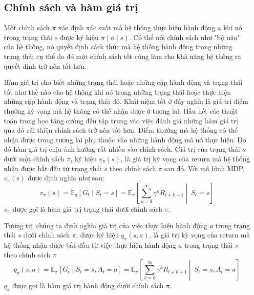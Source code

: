 	
	\subsection{Chính sách và hàm giá trị}
	Một chính sách $\pi$ xác định xác suất mà hệ thông thực hiện hành động $a$ khi nó trong trạng thái $s$ được ký hiệu $\pi(a \mid s)$. Có thể nói chính sách như "bộ não" của hệ thống, nó quyết định cách thức mà hệ thống hành động trong những trạng thái cụ thể do đó một chính sách tốt cũng làm cho khả năng hệ thống ra quyết định trở nên tốt hơn.
		
	Hàm giá trị cho biết những trạng thái hoặc những cặp hành động và trạng thái tốt như thế nào cho hệ thông khi nó trong những trạng thái hoặc thực hiện những cặp hành động và trạng thái đó. Khái niệm tốt ở đây nghĩa là giá trị điểm thưởng kỳ vọng mà hệ thông có thể nhận được ở tương lai. Hầu hết các thuật toán trong học tăng cường đều tập trung vào việc đánh giá những hàm giá trị qua đó cải thiện chính sách trở nên tốt hơn. Điểm thưởng mà hệ thống có thể nhận được trong tương lai phụ thuộc vào những hành động mà nó thực hiện. Do đó hàm giá trị chịu ảnh hưởng rất nhiều vào chính sách. Giá trị của trạng thái $s$ dưới một chính sách $\pi$, ký hiệu $v_{\pi}(s)$, là giá trị kỳ vọng của return mà hệ thống nhận được bắt đầu từ trạng thái $s$ theo chính sách $\pi$ sau đó. Với mô hình MDP, $v_{\pi}(s)$ được định nghĩa như sau:
	\begin{equation}
	v_{\pi}(s) = \mathbb{E}_{\pi}\left [\mathit{G}_t \mid \mathit{S}_{t} = s\right ] = \mathbb{E}_{\pi}\left [\sum_{k = 0}^{\infty}\gamma^{k}\mathit{R}_{t+k+1} \middle|\ \mathit{S}_t= s\right ]
	\end{equation}
	$v_{\pi}$ được gọi là hàm giá trị trạng thái dưới chính sách $\pi$.
	
	Tương tự, chúng ta định nghĩa giá trị của việc thực hiện hành động $a$ trong trạng thái $s$ dưới chính sách $\pi$, được ký hiệu $q_{\pi}(s,a)$, là giá trị kỳ vọng của return mà hệ thống nhận được bắt đầu từ việc thực hiện hành động $a$ trong trạng thái $s$ theo chính sách $\pi$
	\begin{equation}
	\label{action_value}
	q_{\pi}(s,a) = \mathbb{E}_{\pi}\left [\mathit{G}_t \mid \mathit{S}_{t} = s, \mathit{A}_{t} = a  \right ] = \mathbb{E}_{\pi}\left [\sum_{k = 0}^{\infty}\gamma^{k}\mathit{R}_{t+k+1} \middle|\ \mathit{S}_t= s, \mathit{A}_{t} = a \right ]
	\end{equation}
	$q_{\pi}$ được gọi là hàm giá trị hành động dưới chính sách $\pi$.
	
